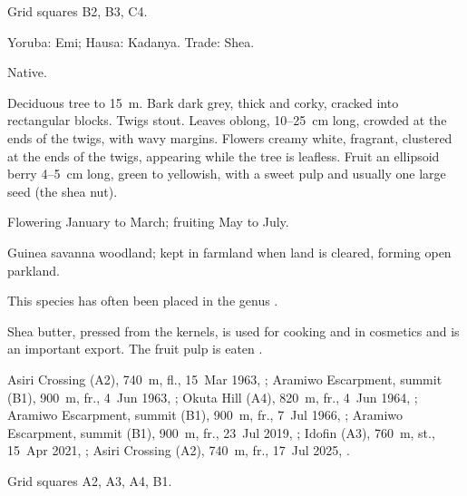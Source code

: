 Grid squares B2, B3, C4.

\begin{center}
\end{center}

\label{sp:SAP02}

 Yoruba: Emi; Hausa: Kadanya. Trade:
Shea.

 Native.

 Deciduous tree to 15~m. Bark dark grey, thick and
corky, cracked into rectangular blocks. Twigs stout. Leaves oblong,
10--25~cm long, crowded at the ends of the twigs, with wavy margins.
Flowers creamy white, fragrant, clustered at the ends of the twigs,
appearing while the tree is leafless. Fruit an ellipsoid berry
4--5~cm long, green to yellowish, with a sweet pulp and usually one
large seed (the shea nut).

 Flowering January to March; fruiting May to July.

 Guinea savanna woodland; kept in farmland when land is
cleared, forming open parkland.

 This species has often been placed in the genus
.

 Shea butter, pressed from the kernels, is used for
cooking and in cosmetics and is an important export. The fruit pulp is
eaten \citep{arbonnier2004,orwa2009}.

 Asiri Crossing (A2), 740~m, fl., 15~Mar 1963, ;
Aramiwo Escarpment, summit (B1), 900~m, fr., 4~Jun 1963, ;
Okuta Hill (A4), 820~m, fr., 4~Jun 1964, ;
Aramiwo Escarpment, summit (B1), 900~m, fr., 7~Jul 1966, ;
Aramiwo Escarpment, summit (B1), 900~m, fr., 23~Jul 2019, ;
Idofin (A3), 760~m, st., 15~Apr 2021, ;
Asiri Crossing (A2), 740~m, fr., 17~Jul 2025, .

 Grid squares A2, A3, A4, B1.

\begin{center}
\end{center}
